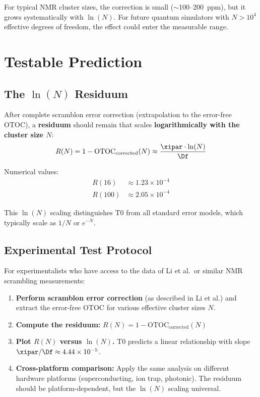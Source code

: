 \begin{remark}
	For typical NMR cluster sizes, the correction is small ($\sim$100--200~ppm), but it grows systematically with $\ln(N)$. For future quantum simulators with $N > 10^4$ effective degrees of freedom, the effect could enter the measurable range.
\end{remark}


\section{Testable Prediction}
\label{sec:prediction}

\subsection{The $\ln(N)$ Residuum}

\begin{experimentbox}
	After complete scramblon error correction (extrapolation to the error-free OTOC), a \textbf{residuum} should remain that scales \textbf{logarithmically with the cluster size $N$}:
	\begin{equation}
		R(N) = 1 - \text{OTOC}_{\text{corrected}}(N) \approx \frac{\xipar \cdot \ln(N)}{\Df}
		\label{eq:residuum}
	\end{equation}
	
	Numerical values:
	\begin{align}
		R(16) &\approx 1.23 \times 10^{-4} \\
		R(100) &\approx 2.05 \times 10^{-4}
	\end{align}
	
	This $\ln(N)$ scaling distinguishes T0 from all standard error models, which typically scale as $1/N$ or $e^{-N}$.
\end{experimentbox}

\subsection{Experimental Test Protocol}

For experimentalists who have access to the data of Li et al.\ or similar NMR scrambling measurements:

\begin{enumerate}
	\item \textbf{Perform scramblon error correction} (as described in Li et al.) and extract the error-free OTOC for various effective cluster sizes $N$.
	\item \textbf{Compute the residuum:} $R(N) = 1 - \text{OTOC}_{\text{corrected}}(N)$
	\item \textbf{Plot $R(N)$ versus $\ln(N)$.} T0 predicts a linear relationship with slope $\xipar/\Df \approx 4.44 \times 10^{-5}$.
	\item \textbf{Cross-platform comparison:} Apply the same analysis on different hardware platforms (superconducting, ion trap, photonic). The residuum should be platform-dependent, but the $\ln(N)$ scaling universal.
\end{enumerate}

